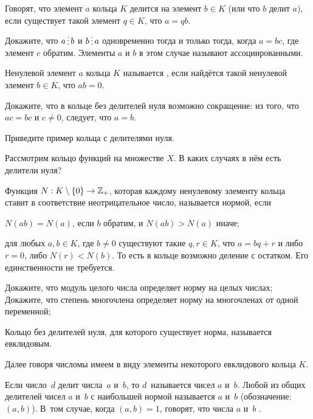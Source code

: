 \documentclass[a4paper,12pt]{article}
\begin{document}
Говорят, что элемент $a$ кольца $K$  делится на элемент $b\in K$ (или что $b$  делит $a$), 
если существует такой элемент $q\in K$, что $a=qb$.

Докажите, что $a\dv b$ и $b\dv a$ одновременно тогда и только тогда, когда $a=bc$, где элемент $c$ обратим.
Элементы $a$ и $b$ в этом случае называют  ассоциированными.

Ненулевой элемент $a$ кольца $K$ называется , 
если найдётся такой ненулевой элемент $b\in K$, что $ab=0$.

Докажите, что в кольце без делителей нуля возможно сокращение:
из того, что $ac = bc$ и $c\ne 0$, следует, что $a=b$.

Приведите пример кольца с делителями нуля.

\newpage
{}
Рассмотрим кольцо функций на множестве $X$.
В каких случаях в нём есть делители нуля?

Функция $N:K\setminus\left\{0\right\}\rightarrow\mathbb{Z}_+$, которая каждому ненулевому элементу кольца ставит в соответствие неотрицательное число,
называется  нормой, если
\begin{nums}{-5}
\item $N(ab)= N(a)$, если $b$ обратим, и $N(ab) > N(a)$ иначе;
\item для любых $a,b\in K$, где $b\ne 0$ существуют такие $q,r\in K$, что $a=bq+r$ и либо $r=0$, либо $N(r) < N(b)$.
То есть в кольце возможно деление с остатком. Его единственности не требуется. 
\end{nums}
\vspace*{-3mm}

 Докажите, что модуль целого числа определяет норму на целых числах;
\\ Докажите, что степень многочлена определяет норму на многочленах от одной переменной;

Кольцо без делителей нуля, для которого существует норма, называется  евклидовым.

Далее говоря  число мы имеем в виду элементы некоторого евклидового кольца $K$.


Если число~$d$ делит числа~$a$ и~$b$, то $d$~называется  чисел $a$ и~$b$.
Любой из общих делителей чисел $a$ и~$b$ с наибольшей нормой называется  $a$ и~$b$
(обозначение: $(a,b)$). В~том случае, когда $(a,b)=1$, говорят, что числа $a$ и~$b$ .
\end{document}
